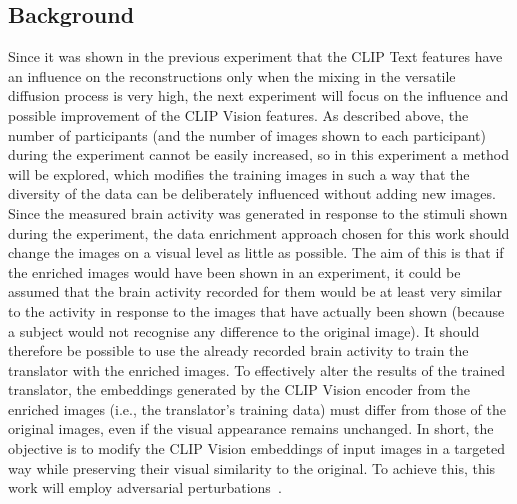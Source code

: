 \subsection{Background}
Since it was shown in the previous experiment that the CLIP Text features have an influence on the reconstructions only when the mixing in the versatile diffusion process is very high, the next experiment will focus on the influence and possible improvement of the CLIP Vision features. As described above, the number of participants (and the number of images shown to each participant) during the experiment cannot be easily increased, so in this experiment a method will be explored, which modifies the training images in such a way that the diversity of the data can be deliberately influenced without adding new images. Since the measured brain activity was generated in response to the stimuli shown during the experiment, the data enrichment approach chosen for this work should change the images on a visual level as little as possible. The aim of this is that if the enriched images would have been shown in an experiment, it could be assumed that the brain activity recorded for them would be at least very similar to the activity in response to the images that have actually been shown (because a subject would not recognise any difference to the original image). It should therefore be possible to use the already recorded brain activity to train the translator with the enriched images. To effectively alter the results of the trained translator, the embeddings generated by the CLIP Vision encoder from the enriched images (i.e., the translator's training data) must differ from those of the original images, even if the visual appearance remains unchanged. In short, the objective is to modify the CLIP Vision embeddings of input images in a targeted way while preserving their visual similarity to the original. To achieve this, this work will employ adversarial perturbations~\cite{goodfellowExplainingHarnessingAdversarial2014, papernotPracticalBlackBoxAttacks2017, naseerIntriguingPropertiesVision2021}.

